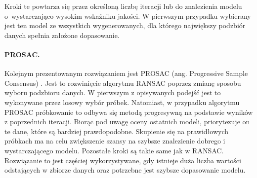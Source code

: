 Kroki te powtarza się przez określoną liczbę iteracji lub do znalezienia modelu o~wystarczająco wysokim wskaźniku jakości. W pierwszym przypadku wybierany jest ten model ze wszystkich wygenerowanych, dla którego największy podzbiór danych spełnia założone dopasowanie. 


\paragraph{PROSAC.} Kolejnym prezentowanym rozwiązaniem jest PROSAC (ang. Progressive Sample Consensus) \cite{prosac}. Jest to rozwinięcie algorytmu RANSAC poprzez zmianę sposobu wyboru podzbioru danych. W pierwszym z opisywanych podejść jest to wykonywane przez losowy wybór próbek. Natomiast, w przypadku algorytmu PROSAC próbkowanie to odbywa się metodą progresywną na podstawie wyników z poprzednich iteracji. Biorąc pod uwagę oceny ostatnich modeli, priorytezuje on te dane, które są bardziej prawdopodobne. Skupienie się na prawidłowych próbkach ma na celu zwiększenie szansy na szybsze znalezienie dobrego i wystarczającego modelu. Pozostałe kroki są takie same jak w RANSAC. Rozwiązanie to jest częściej wykorzystywane, gdy istnieje duża liczba wartości odstających w zbiorze danych oraz potrzebne jest szybsze dopasowanie modelu. 